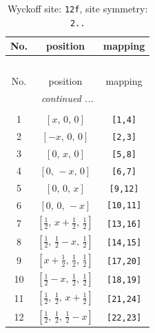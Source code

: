 \documentclass[fleqn,8pt]{jsarticle}
\begin{document}
\begin{longtable}{ccc}
\caption{Wyckoff site: {\tt 12f}, site symmetry: {\tt 2..}}
 \\
 \hline \hline
No. & position & mapping \\ \hline \endfirsthead

\multicolumn{2}{l}{\tablename\ \thetable{}} \\
 \hline \hline
No. & position & mapping \\ \hline \endhead

 \hline \hline
\multicolumn{2}{r}{\footnotesize\it continued ...} \\ \endfoot

 \hline \hline
\multicolumn{2}{r}{} \\ \endlastfoot

1 & $\left[ x,\, 0,\, 0 \right]$ & {\tt [1,4]} \\ \hline
2 & $\left[ - x,\, 0,\, 0 \right]$ & {\tt [2,3]} \\ \hline
3 & $\left[ 0,\, x,\, 0 \right]$ & {\tt [5,8]} \\ \hline
4 & $\left[ 0,\, - x,\, 0 \right]$ & {\tt [6,7]} \\ \hline
5 & $\left[ 0,\, 0,\, x \right]$ & {\tt [9,12]} \\ \hline
6 & $\left[ 0,\, 0,\, - x \right]$ & {\tt [10,11]} \\ \hline
7 & $\left[ \frac{1}{2},\, x + \frac{1}{2},\, \frac{1}{2} \right]$ & {\tt [13,16]} \\ \hline
8 & $\left[ \frac{1}{2},\, \frac{1}{2} - x,\, \frac{1}{2} \right]$ & {\tt [14,15]} \\ \hline
9 & $\left[ x + \frac{1}{2},\, \frac{1}{2},\, \frac{1}{2} \right]$ & {\tt [17,20]} \\ \hline
10 & $\left[ \frac{1}{2} - x,\, \frac{1}{2},\, \frac{1}{2} \right]$ & {\tt [18,19]} \\ \hline
11 & $\left[ \frac{1}{2},\, \frac{1}{2},\, x + \frac{1}{2} \right]$ & {\tt [21,24]} \\ \hline
12 & $\left[ \frac{1}{2},\, \frac{1}{2},\, \frac{1}{2} - x \right]$ & {\tt [22,23]} \\
\end{longtable}
\renewcommand{\arraystretch}{1.2}
\end{document}
